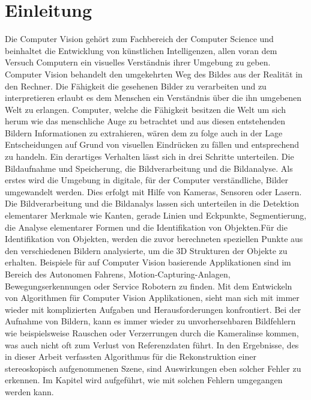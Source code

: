 \chapter{Einleitung}
\label{sec:einleitung} 



Die Computer Vision gehört zum Fachbereich der Computer Science und beinhaltet die Entwicklung von künstlichen Intelligenzen, allen voran dem Versuch Computern ein visuelles Verständnis ihrer Umgebung zu geben. Computer Vision behandelt den umgekehrten Weg des Bildes aus der Realität in den Rechner\cite{ComputerVision}. Die Fähigkeit die gesehenen Bilder zu verarbeiten und zu interpretieren erlaubt es dem Menschen ein Verständnis über die ihn umgebenen Welt zu erlangen. Computer, welche die Fähigkeit besitzen die Welt um sich herum wie das menschliche Auge zu betrachtet und aus diesen entstehenden Bildern Informationen zu extrahieren, wären dem zu folge auch in der Lage Entscheidungen auf Grund von visuellen Eindrücken zu fällen und entsprechend zu handeln. Ein derartiges Verhalten lässt sich in drei Schritte unterteilen. Die Bildaufnahme und Speicherung, die Bildverarbeitung und die Bildanalyse\cite{ComputerVision}. Als erstes wird die Umgebung in digitale, für der Computer verständliche, Bilder umgewandelt werden. Dies erfolgt mit Hilfe von Kameras, Sensoren oder Lasern. 
 Die Bildverarbeitung und die Bildanalys lassen sich unterteilen in die Detektion elementarer Merkmale wie Kanten, gerade Linien und Eckpunkte, Segmentierung, die Analyse elementarer Formen und die Identifikation von Objekten\cite{CamerModels.}.Für die Identifikation von Objekten, werden die zuvor berechneten speziellen Punkte aus den verschiedenen Bildern analysierte, um die 3D Strukturen der Objekte zu erhalten. 
% 
% 
Beispiele für auf Computer Vision basierende Applikationen sind im Bereich des Autonomen Fahrens, Motion-Capturing-Anlagen, Bewegungserkennungen oder Service Robotern zu finden. Mit dem Entwickeln von Algorithmen für Computer Vision Applikationen, sieht man sich mit immer wieder mit komplizierten Aufgaben und Herausforderungen konfrontiert. Bei der Aufnahme von Bildern, kann es immer wieder zu unvorhersehbaren Bildfehlern wie beispielsweise Rauschen oder Verzerrungen durch die Kameralinse kommen, was auch nicht oft zum Verlust von Referenzdaten führt. In den Ergebnisse, des in dieser Arbeit verfassten Algorithmus für die Rekonstruktion einer stereoskopisch aufgenommenen Szene, sind Auswirkungen eben solcher Fehler zu erkennen. Im Kapitel  wird aufgeführt, wie mit solchen Fehlern umgegangen werden kann.
